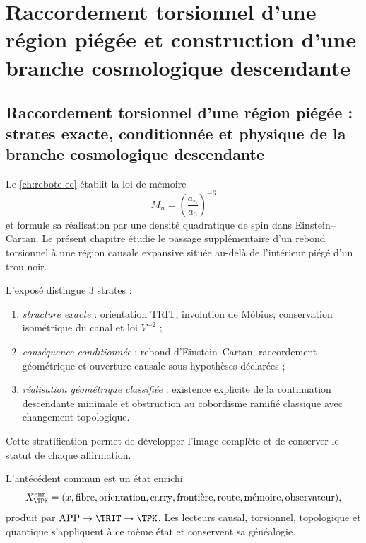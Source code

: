 \chapter{Raccordement torsionnel d'une région piégée et construction d'une branche cosmologique descendante}
\label{chap:universo-descendiente}

\section{Raccordement torsionnel d'une région piégée : strates exacte, conditionnée et physique de la branche cosmologique descendante}

Le \cref{ch:rebote-ec} établit la loi de mémoire
\begin{equation}
 M_n=\left(\frac{a_n}{a_0}\right)^{-6}
 \label{eq:descendant-memory-law}
\end{equation}
et formule sa réalisation par une densité quadratique de spin dans
Einstein--Cartan. Le présent chapitre étudie le passage supplémentaire d'un
rebond torsionnel à une région causale expansive située au-delà de l'intérieur
piégé d'un trou noir.

L'exposé distingue \(3\) strates :
\begin{enumerate}
 \item \emph{structure exacte} : orientation TRIT, involution de Möbius,
       conservation isométrique du canal et loi \(V^{-2}\) ;
 \item \emph{conséquence conditionnée} : rebond d'Einstein--Cartan,
       raccordement géométrique et ouverture causale sous hypothèses déclarées ;
 \item \emph{réalisation géométrique classifiée} : existence explicite de
       la continuation descendante minimale et obstruction au cobordisme
       ramifié classique avec changement topologique.
\end{enumerate}
Cette stratification permet de développer l'image complète et de conserver le
statut de chaque affirmation.

L'antécédent commun est un état enrichi
\begin{equation}
 X^{\rm enr}_{\TPK}
 =(x,\text{fibre},\text{orientation},\text{carry},
   \text{frontière},\text{route},\text{mémoire},\text{observateur}),
 \label{eq:descendant-enriched-state}
\end{equation}
produit par \(\mathrm{APP}\to\TRIT\to\TPK\). Les lecteurs causal,
torsionnel, topologique et quantique s'appliquent à ce même état et
conservent sa généalogie.

